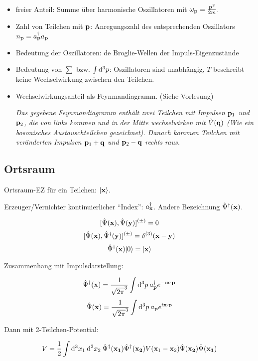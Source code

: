\documentclass[11pt,a4paper]{report}
\begin{document}
\begin{itemize}
\item freier Anteil: Summe über harmonische Oszillatoren mit $\omega_{\mathbf{p}} = \frac{\mathbf{p}^2}{2m}$.
\item Zahl von Teilchen mit $\mathbf{p}$: Anregungszahl des entsprechenden Oszillators $n_{\mathbf{p}} =a_{\mathbf{p}}^\dagger a_{\mathbf{p}}$
\item Bedeutung der Oszillatoren: de Broglie-Wellen der Impuls-Eigenzustände
\item Bedeutung von $\sum$ bzw. $\int\mathrm{d}^3p$: Oszillatoren sind unabhängig, $T$ beschreibt keine Wechselwirkung zwischen den Teilchen.
\item Wechselwirkungsanteil als Feynmandiagramm. (Siehe Vorlesung)\par 
\small{\textit{Das gegebene Feynmandiagramm enthält zwei Teilchen mit Impulsen $\mathbf{p}_1$ und $\mathbf{p}_2$, die von links kommen und in der Mitte wechselwirken mit $\tilde{V}(\mathbf{q})$ (Wie ein bosonisches Austauschteilchen gezeichnet). Danach kommen Teilchen mit veränderten Impulsen $\mathbf{p}_1+\mathbf{q}$ und $\mathbf{p}_2-\mathbf{q}$ rechts raus.}}
\end{itemize}

\subsection{Ortsraum}

Ortsraum-EZ für ein Teilchen: $|\mathbf{x}\rangle$.\par 

\newcommand{\ccreate}[1]{\hat{\Psi}^\dagger (\vf{#1})}
\newcommand{\ddestroy}[1]{\hat{\Psi} (\vf{#1})}

Erzeuger/Vernichter kontinuierlicher ``Index'': $a_{\mathbf{x}}^\dagger$. Andere Bezeichnung $\hat{\Psi}^\dagger (\mathbf{x})$.

$$[\ddestroy{x},\ddestroy{y}]^{(\pm )}=0$$
$$[\ddestroy{x},\ccreate{y}]^{(\pm )}=\delta^{(3)}(\vf{x}-\vf{y})$$
$$\ccreate{x}\vac = \ket{\vf{x}}$$

Zusammenhang mit Impulsdarstellung:

$$\ccreate{x}=\frac{1}{\sqrt{2\pi}^3}\int\dif^3p\: \create{\vf{p}} e^{-i\vf{x}\cdot\vf{p}}$$
$$\ddestroy{x}=\frac{1}{\sqrt{2\pi}^3}\int\dif^3p\: \destroy{\vf{p}} e^{i\vf{x}\cdot\vf{p}}$$

Dann mit 2-Teilchen-Potential:

$$V = \frac{1}{2}\int\dif^3x_1\:\dif^3x_2\:\ccreate{x_1}\ccreate{x_2}V(\vf{x}_1-\vf{x}_2)\ddestroy{x_2}\ddestroy{x_1}$$
\end{document}

